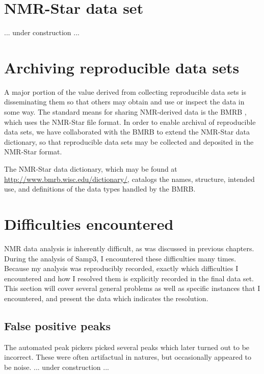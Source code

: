 \section{NMR-Star data set}
... under construction ...


\section{Archiving reproducible data sets}
A major portion of the value derived from collecting reproducible data sets
is disseminating them so that others may obtain and use or inspect the data
in some way.  The standard means for sharing NMR-derived data is the BMRB
\cite{bmrb}, which uses the NMR-Star file format.  In order to enable archival
of reproducible data sets, we have collaborated with the BMRB to extend the
NMR-Star data dictionary, so that reproducible data sets may be collected and
deposited in the NMR-Star format.

The NMR-Star data dictionary, which may be found at 
\url{http://www.bmrb.wisc.edu/dictionary/}, catalogs the names, structure,
intended use, and definitions of the data types handled by the BMRB.


\section{Difficulties encountered}

NMR data analysis is inherently difficult, as was discussed in previous 
chapters.  During the analysis of Samp3, I encountered these difficulties 
many times.  Because my analysis was reproducibly recorded, exactly which
difficulties I encountered and how I resolved them is explicitly recorded
in the final data set.  This section will cover several general problems
as well as specific instances that I encountered, and present the data which
indicates the resolution.

\subsection{False positive peaks}
The automated peak pickers picked several peaks which later turned out to
be incorrect.  These were often artifactual in natures, but occasionally 
appeared to be noise.
... under construction ...

